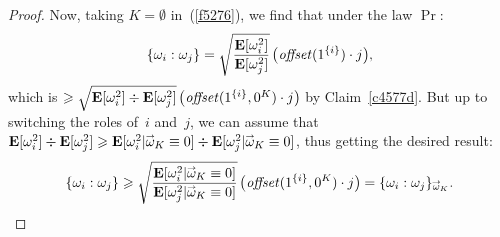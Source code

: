\begin{proof}
Now, taking $K=\emptyset$ in~(\ref{f5276}), we find that under the law $\Pr$:
\[ \{\omega_i:\omega_j\} = \sqrt{\frac{\EE[\omega_i^2]}{\EE[\omega_j^2]}} \,
\big(\offset(1^{\{i\}})\cdot j\big) ,\]
which is $\geq \sqrt{\EE[\omega_i^2] \div \EE[\omega_j^2]} \, \big(\offset(1^{\{i\}},0^K)\cdot j\big)$
by Claim~\ref{c4577d}.
But up to switching the roles of~$i$ and~$j$, we can assume that
$\EE[\omega_i^2] \div \EE[\omega_j^2] \geq
\EE[\omega_i^2|\vec\omega_K\equiv0] \div \EE[\omega_j^2|\vec\omega_K\equiv0]$,
thus getting the desired result:
\[ \{\omega_i:\omega_j\}
\geq \sqrt{\frac{\EE[\omega_i^2|\vec\omega_K\equiv0]}{\EE[\omega_j^2|\vec\omega_K\equiv0]}} \, \big(\offset(1^{\{i\}},0^K)\cdot j\big) = \{\omega_i:\omega_j\}_{\vec\omega_K} .\]
\end{proof}

\begingroup{}
